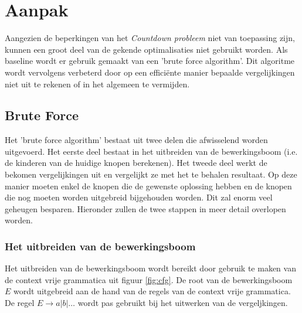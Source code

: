 \documentclass[Main.tex]{subfiles}
\begin{document}
\section{Aanpak}
Aangezien de beperkingen van het \textit{Countdown probleem} niet van toepassing zijn, kunnen een groot deel van de gekende optimalisaties niet gebruikt worden. Als baseline wordt er gebruik gemaakt van een 'brute force algorithm'. Dit algoritme wordt vervolgens verbeterd door op een effici\"ente manier bepaalde vergelijkingen niet uit te rekenen of in het algemeen te vermijden.

\subsection{Brute Force}
Het 'brute force algorithm' bestaat uit twee delen die afwisselend worden uitgevoerd. Het eerste deel bestaat in het uitbreiden van de bewerkingsboom (i.e. de kinderen van de huidige knopen berekenen). Het tweede deel werkt de bekomen vergelijkingen uit en vergelijkt ze met het te behalen resultaat. Op deze manier moeten enkel de knopen die de gewenste oplossing hebben en de knopen die nog moeten worden uitgebreid bijgehouden worden. Dit zal enorm veel geheugen besparen. Hieronder zullen de twee stappen in meer detail overlopen worden. 

\subsubsection*{Het uitbreiden van de bewerkingsboom}
Het uitbreiden van de bewerkingsboom wordt bereikt door gebruik te maken van de context vrije grammatica uit figuur \ref{fig:cfg}. De root van de bewerkingsboom $E$ wordt uitgebreid aan de hand van de regels van de context vrije grammatica. De regel $E \rightarrow a | b | \dotsc$ wordt pas gebruikt bij het uitwerken van de vergeljkingen. %
\end{document}
